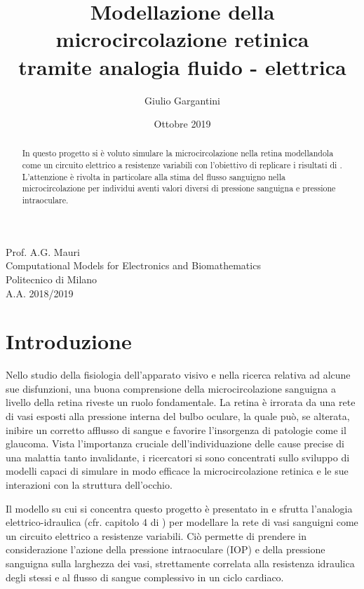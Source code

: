 \documentclass{article}
\title{\vspace{-2cm} Modellazione della microcircolazione retinica\\tramite analogia fluido - elettrica} %
\author{Giulio Gargantini} %
\date{Ottobre 2019} %
\begin{document}
\maketitle %

\begin{center}
Prof. A.G. Mauri \\
Computational Models for Electronics and Biomathematics\\
Politecnico di Milano\\
A.A. 2018/2019
\end{center}

\begin{abstract}
In questo progetto si è voluto simulare la microcircolazione nella retina modellandola come un circuito elettrico a resistenze variabili con l'obiettivo di replicare i risultati di \cite{art1}.
L'attenzione è rivolta in particolare alla stima del flusso sanguigno nella microcircolazione per individui aventi valori diversi di pressione sanguigna e pressione intraoculare.
\end{abstract}

\tableofcontents
\newpage

\section{Introduzione}
Nello studio della fisiologia dell'apparato visivo e nella ricerca relativa ad alcune sue disfunzioni, una buona comprensione della microcircolazione sanguigna a livello della retina riveste un ruolo fondamentale.
La retina è irrorata da una rete di vasi esposti alla pressione interna del bulbo oculare, la quale può, se alterata, inibire un corretto afflusso di sangue e favorire l'insorgenza di patologie come il glaucoma.
Vista l'importanza cruciale dell'individuazione delle cause precise di una malattia tanto invalidante, i ricercatori si sono concentrati sullo sviluppo di modelli capaci di simulare in modo efficace la microcircolazione retinica e le sue interazioni con la struttura dell'occhio.

Il modello su cui si concentra questo progetto è presentato in \cite{art1} e sfrutta l'analogia elettrico-idraulica (cfr. capitolo 4 di \cite{notes}) per modellare la rete di vasi sanguigni come un circuito elettrico a resistenze variabili.
Ciò permette di prendere in considerazione l'azione della pressione intraoculare (IOP) e della pressione sanguigna sulla larghezza dei vasi, strettamente correlata alla resistenza idraulica degli stessi e al flusso di sangue complessivo in un ciclo cardiaco.
\end{document}
